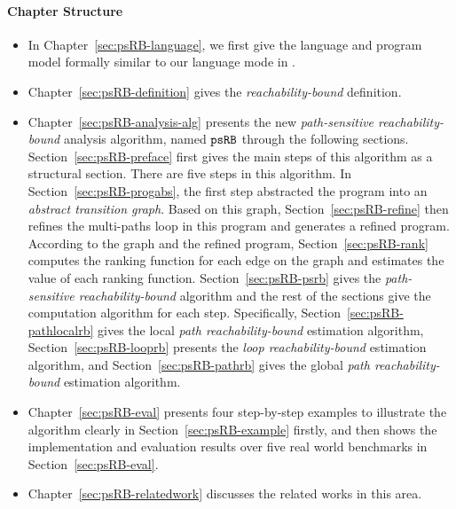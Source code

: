 \paragraph{Chapter Structure}

\begin{itemize}
\item In Chapter~{\ref{sec:psRB-language}}, we first give the language and program model formally similar to our language mode in
.

\item  Chapter~\ref{sec:psRB-definition} gives the \emph{reachability-bound} definition.

\item Chapter~\ref{sec:psRB-analysis-alg} presents the new \emph{path-sensitive reachability-bound} analysis algorithm, named $\mathtt{psRB}$ through the following sections.
%
Section~\ref{sec:psRB-preface} first gives the main steps of this algorithm as a structural section. There are five steps in this algorithm.
In Section~\ref{sec:psRB-progabs}, the first step abstracted the program into an \emph{abstract transition graph}.
Based on this graph, Section~\ref{sec:psRB-refine} then refines the multi-paths loop in this program and generates a refined program.
According to the graph and the refined program, Section~\ref{sec:psRB-rank} computes the ranking function for each edge on the graph and estimates the value of each ranking function.
Section~\ref{sec:psRB-psrb} gives the \emph{path-sensitive reachability-bound} algorithm and the rest of the sections give the computation algorithm for each step. Specifically, 
Section~\ref{sec:psRB-pathlocalrb} gives the local \emph{path reachability-bound} estimation algorithm, Section~\ref{sec:psRB-looprb} presents the \emph{loop reachability-bound} estimation algorithm,
and Section~\ref{sec:psRB-pathrb} gives the global  \emph{path reachability-bound} estimation algorithm.

\item  {Chapter~{\ref{sec:psRB-eval}}} presents four step-by-step examples to illustrate the algorithm clearly in Section~\ref{sec:psRB-example} firstly,
and then shows the implementation and evaluation results over five real world benchmarks in Section~\ref{sec:psRB-eval}.

\item {Chapter~\ref{sec:psRB-relatedwork}} discusses the related works in this area.
\end{itemize}

